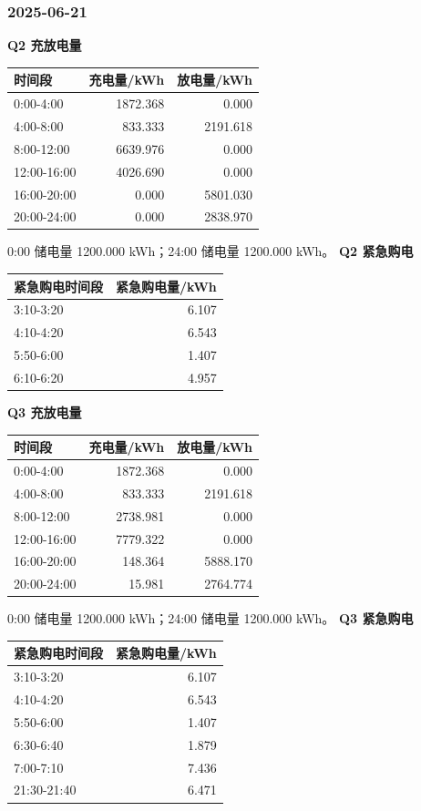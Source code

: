 \subsubsection{2025-06-21}
\textbf{Q2 充放电量}
\begin{longtable}[]{@{}lrr@{}}\toprule 时间段 & 充电量/kWh & 放电量/kWh \\\midrule\endhead
0:00-4:00 & 1872.368 & 0.000 \\
4:00-8:00 & 833.333 & 2191.618 \\
8:00-12:00 & 6639.976 & 0.000 \\
12:00-16:00 & 4026.690 & 0.000 \\
16:00-20:00 & 0.000 & 5801.030 \\
20:00-24:00 & 0.000 & 2838.970 \\
\bottomrule\end{longtable}
0:00 储电量 1200.000 kWh；24:00 储电量 1200.000 kWh。
\textbf{Q2 紧急购电}
\begin{longtable}[]{@{}lr@{}}\toprule 紧急购电时间段 & 紧急购电量/kWh \\\midrule\endhead
3:10-3:20 & 6.107 \\
4:10-4:20 & 6.543 \\
5:50-6:00 & 1.407 \\
6:10-6:20 & 4.957 \\
\bottomrule\end{longtable}
\textbf{Q3 充放电量}
\begin{longtable}[]{@{}lrr@{}}\toprule 时间段 & 充电量/kWh & 放电量/kWh \\\midrule\endhead
0:00-4:00 & 1872.368 & 0.000 \\
4:00-8:00 & 833.333 & 2191.618 \\
8:00-12:00 & 2738.981 & 0.000 \\
12:00-16:00 & 7779.322 & 0.000 \\
16:00-20:00 & 148.364 & 5888.170 \\
20:00-24:00 & 15.981 & 2764.774 \\
\bottomrule\end{longtable}
0:00 储电量 1200.000 kWh；24:00 储电量 1200.000 kWh。
\textbf{Q3 紧急购电}
\begin{longtable}[]{@{}lr@{}}\toprule 紧急购电时间段 & 紧急购电量/kWh \\\midrule\endhead
3:10-3:20 & 6.107 \\
4:10-4:20 & 6.543 \\
5:50-6:00 & 1.407 \\
6:30-6:40 & 1.879 \\
7:00-7:10 & 7.436 \\
21:30-21:40 & 6.471 \\
\bottomrule\end{longtable}

